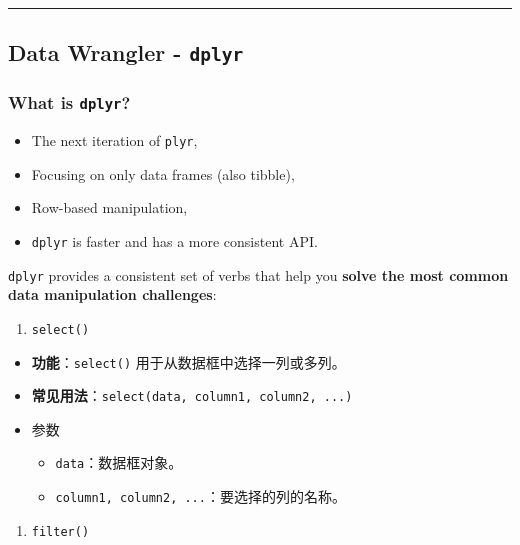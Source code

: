 \documentclass[
]{article}
\begin{document}
\begin{center}\rule{0.5\linewidth}{0.5pt}\end{center}

\hypertarget{data-wrangler---dplyr}{%
\subsection{\texorpdfstring{Data Wrangler -
\texttt{dplyr}}{Data Wrangler - dplyr}}\label{data-wrangler---dplyr}}

\hypertarget{what-is-dplyr}{%
\subsubsection{\texorpdfstring{What is
\texttt{dplyr}?}{What is dplyr?}}\label{what-is-dplyr}}

\begin{itemize}
\item
  The next iteration of \texttt{plyr},
\item
  Focusing on only data frames (also tibble),
\item
  Row-based manipulation,
\item
  \texttt{dplyr} is faster and has a more consistent API.
\end{itemize}

\texttt{dplyr} provides a consistent set of verbs that help you
\textbf{solve the most common data manipulation challenges}:

\begin{enumerate}
\def\labelenumi{\arabic{enumi}.}
\item
  \texttt{select()}
\end{enumerate}

\begin{itemize}
\item
  \textbf{功能}：\texttt{select()} 用于从数据框中选择一列或多列。
\item
  \textbf{常见用法}：\texttt{select(data,\ column1,\ column2,\ ...)}
\item
  参数

  \begin{itemize}
  \item
    \texttt{data}：数据框对象。
  \item
    \texttt{column1,\ column2,\ ...}：要选择的列的名称。
  \end{itemize}
\end{itemize}

\begin{enumerate}
\def\labelenumi{\arabic{enumi}.}
\item
  \texttt{filter()}
\end{enumerate}
\end{document}
